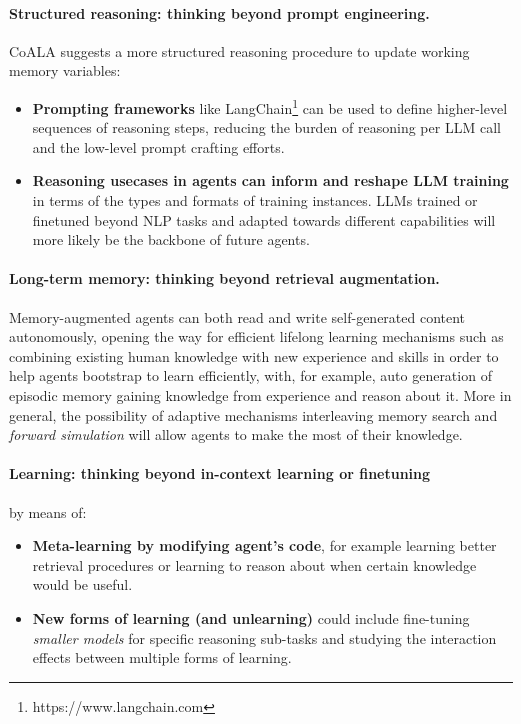 \paragraph{Structured reasoning: thinking beyond prompt engineering.} \ac{CoALA} suggests
a more structured reasoning procedure to update working memory variables:
\begin{itemize}
    \item \textbf{Prompting frameworks} like
        LangChain\footnote{https://www.langchain.com} can be used to define
        higher-level sequences of reasoning steps, reducing the burden of
        reasoning per \ac{LLM} call and the low-level prompt crafting efforts.
    \item \textbf{Reasoning usecases in agents can inform and reshape LLM
        training} in terms of the types and formats of training instances.
        \ac{LLM}s trained or finetuned beyond NLP tasks and adapted towards
        different capabilities will more likely be the backbone of future
        agents.
\end{itemize}

\paragraph{Long-term memory: thinking beyond retrieval augmentation.}
Memory-augmented agents can both read and write self-generated content
autonomously, opening the way for efficient lifelong learning mechanisms such
as combining existing human knowledge with new experience and skills in order
to help agents bootstrap to learn efficiently, with, for example, auto
generation of episodic memory gaining knowledge from experience and reason
about it. More in general, the possibility of adaptive mechanisms interleaving
memory search and \emph{forward simulation} will allow agents to make the most
of their knowledge.

\paragraph{Learning: thinking beyond in-context learning or finetuning} by means of:
\begin{itemize}
    \item \textbf{Meta-learning by modifying agent's code}, for example
        learning better retrieval procedures or learning to reason about when
        certain knowledge would be useful.
    \item \textbf{New forms of learning (and unlearning)} could include
        fine-tuning \emph{smaller models} for specific reasoning sub-tasks and
        studying the interaction effects between multiple forms of learning.
\end{itemize}

